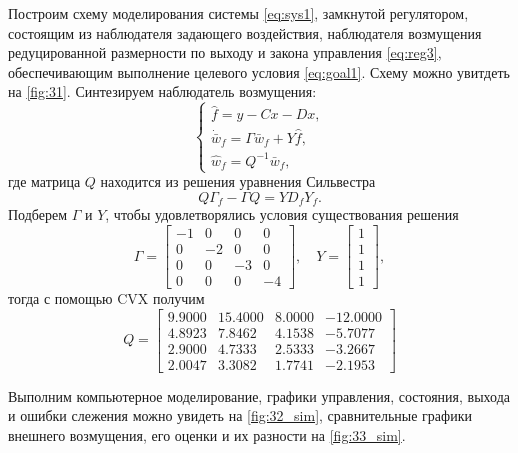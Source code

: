 Построим схему моделирования системы \eqref{eq:sys1}, замкнутой регулятором,
состоящим из наблюдателя задающего воздействия, наблюдателя возмущения редуцированной
размерности по выходу и закона управления \eqref{eq:reg3},
обеспечивающим выполнение целевого условия \eqref{eq:goal1}. Схему можно
увитдеть на \autoref{fig:31}.
Синтезируем наблюдатель возмущения:
\begin{equation*}
    \begin{cases}
        \hat f=y-Cx-Dx,\\
        \dot{\bar w}_f=\Gamma\bar w_f+Y\hat f,\\
        \hat w_f=Q^{-1}\bar w_f,
    \end{cases}
\end{equation*}
где матрица $Q$ находится из решения уравнения Сильвестра
\begin{equation*}
    Q\Gamma_f-\Gamma Q=YD_fY_f.
\end{equation*}
Подберем $\Gamma$ и $Y$, чтобы удовлетворялись условия существования решения
\begin{equation*}
    \Gamma=\begin{bmatrix}
        -1 & 0 & 0 & 0 \\
        0 & -2 & 0 & 0\\
        0 & 0 & -3 & 0\\
        0 & 0& 0& -4
    \end{bmatrix},\quad
    Y=\begin{bmatrix}
        1 \\ 1\\1\\ 1
    \end{bmatrix},
\end{equation*}
тогда с помощью CVX получим
\begin{equation*}
    Q=\begin{bmatrix}
            9.9000 & 15.4000 & 8.0000 & -12.0000 \\
            4.8923 & 7.8462 & 4.1538 & -5.7077 \\
            2.9000 & 4.7333 & 2.5333 & -3.2667 \\
            2.0047 & 3.3082 & 1.7741 & -2.1953
        \end{bmatrix}
\end{equation*}

Выполним компьютерное моделирование, графики управления, состояния, выхода и ошибки слежения 
можно увидеть на \autoref{fig:32_sim}, сравнительные графики внешнего возмущения,
его оценки и их разности на \autoref{fig:33_sim}.

